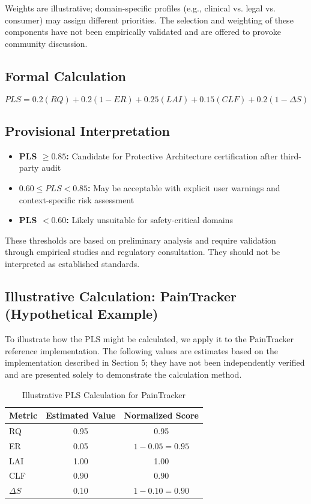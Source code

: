 \documentclass[acmsmall,review]{acmart}
\begin{document}
Weights are illustrative; domain-specific profiles (e.g., clinical vs. legal vs. consumer) may assign different priorities. The selection and weighting of these components have not been empirically validated and are offered to provoke community discussion.

\subsection{Formal Calculation}

\[
PLS = 0.2(RQ) + 0.2(1 - ER) + 0.25(LAI) + 0.15(CLF) + 0.2(1 - \Delta S)
\]

\subsection{Provisional Interpretation}

\begin{itemize}
    \item \textbf{PLS $\ge 0.85$:} Candidate for Protective Architecture certification after third-party audit
    \item \textbf{$0.60 \le PLS < 0.85$:} May be acceptable with explicit user warnings and context-specific risk assessment
    \item \textbf{PLS $< 0.60$:} Likely unsuitable for safety-critical domains
\end{itemize}

These thresholds are based on preliminary analysis and require validation through empirical studies and regulatory consultation. They should not be interpreted as established standards.

\subsection{Illustrative Calculation: PainTracker (Hypothetical Example)}

To illustrate how the PLS might be calculated, we apply it to the PainTracker reference implementation. The following values are estimates based on the implementation described in Section 5; they have not been independently verified and are presented solely to demonstrate the calculation method.

\begin{table}[h]
\centering
\caption{Illustrative PLS Calculation for PainTracker}
\label{tab:pls-example}
\begin{tabular}{lcc}
\toprule
\textbf{Metric} & \textbf{Estimated Value} & \textbf{Normalized Score} \\
\midrule
RQ & 0.95 & 0.95 \\
ER & 0.05 & $1 - 0.05 = 0.95$ \\
LAI & 1.00 & 1.00 \\
CLF & 0.90 & 0.90 \\
$\Delta S$ & 0.10 & $1 - 0.10 = 0.90$ \\
\bottomrule
\end{tabular}
\end{table}
\end{document}
